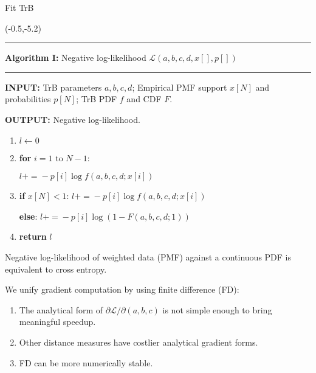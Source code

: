 \documentclass[aspectratio=169]{beamer}
\begin{document}
\begin{frame}{Fit TrB}
\begin{textblock}{7}(-0.5,-5.2)
\begin{tiny}
\rule{7cm}{0.4pt}\smallskip
		
		\textbf{Algorithm I:} Negative log-likelihood $\mathcal{L}(a, b, c, d, x[], p[])$
		\rule{7cm}{0.4pt}
		
		\textbf{INPUT:} TrB parameters $a, b, c, d$; Empirical PMF support $x[N]$ and probabilities $p[N]$; TrB PDF $f$ and CDF $F$.\smallskip
		
		\textbf{OUTPUT:} Negative log-likelihood.\smallskip
		
\begin{enumerate}
\item $l\gets0$\smallskip

\item \textbf{for} $i = 1$ to $N-1$:\smallskip

\hspace{1em}$l \mathrel{{+}{=}} - p[i]\log f(a, b, c, d; x[i])$\smallskip

\item 
\textbf{if} $x[N] < 1$: $l \mathrel{{+}{=}} - p[i]\log f(a, b, c, d; x[i])$\smallskip

\textbf{else}: $l \mathrel{{+}{=}} - p[i]\log(1 - F(a, b, c, d; 1))$\smallskip

\item \textbf{return} $l$
\end{enumerate}\smallskip  

Negative log-likelihood of weighted data (PMF) against a continuous PDF is equivalent to cross entropy.\medskip\pause

We unify gradient computation by using finite difference (FD):\medskip

\begin{enumerate}
\item The analytical form of $\partial\mathcal{L}/\partial(a, b, c)$ is not simple enough to bring meaningful speedup.\medskip

\item Other distance measures have costlier analytical gradient forms.\medskip

\item FD can be more numerically stable.
\end{enumerate}



\end{tiny}
\end{textblock}
\end{frame}
\end{document}
